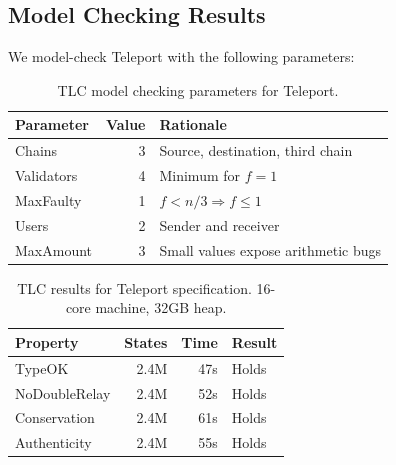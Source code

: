 \subsection{Model Checking Results}

We model-check Teleport with the following parameters:

\begin{table}[H]
\centering
\small
\begin{tabular}{@{}lrl@{}}
\toprule
\textbf{Parameter} & \textbf{Value} & \textbf{Rationale} \\
\midrule
Chains & 3 & Source, destination, third chain \\
Validators & 4 & Minimum for $f = 1$ \\
MaxFaulty & 1 & $f < n/3 \Rightarrow f \leq 1$ \\
Users & 2 & Sender and receiver \\
MaxAmount & 3 & Small values expose arithmetic bugs \\
\bottomrule
\end{tabular}
\caption{TLC model checking parameters for Teleport.}
\end{table}

\begin{table}[H]
\centering
\small
\begin{tabular}{@{}lrrl@{}}
\toprule
\textbf{Property} & \textbf{States} & \textbf{Time} & \textbf{Result} \\
\midrule
TypeOK & 2.4M & 47s & Holds \\
NoDoubleRelay & 2.4M & 52s & Holds \\
Conservation & 2.4M & 61s & Holds \\
Authenticity & 2.4M & 55s & Holds \\
\bottomrule
\end{tabular}
\caption{TLC results for Teleport specification. 16-core machine, 32GB heap.}
\end{table}

